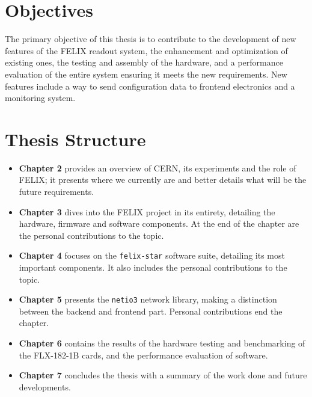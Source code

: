 \section{Objectives}

The primary objective of this thesis is to contribute to the development of new features of the \acs{FELIX} readout system, the enhancement and optimization of existing ones, the testing and assembly of the hardware, and a performance evaluation of the entire system ensuring it meets the new requirements.
New features include a way to send configuration data to frontend electronics and a monitoring system.

\section{Thesis Structure}

\begin{itemize}
    \item \textbf{Chapter 2} provides an overview of \acs{CERN}, its experiments and the role of \acs{FELIX}; it presents where we currently are and better details what will be the future requirements.
    
    \item \textbf{Chapter 3} dives into the \acs{FELIX} project in its entirety, detailing the hardware, firmware and software components. At the end of the chapter are the personal contributions to the topic.
    
    \item \textbf{Chapter 4} focuses on the \texttt{felix-star} software suite, detailing its most important components. It also includes the personal contributions to the topic.
    
    \item \textbf{Chapter 5} presents the \texttt{netio3} network library, making a distinction between the backend and frontend part. Personal contributions end the chapter.
    
    \item \textbf{Chapter 6} contains the results of the hardware testing and benchmarking of the FLX-182-1B cards, and the performance evaluation of software.
    
    \item \textbf{Chapter 7} concludes the thesis with a summary of the work done and future developments.
\end{itemize}